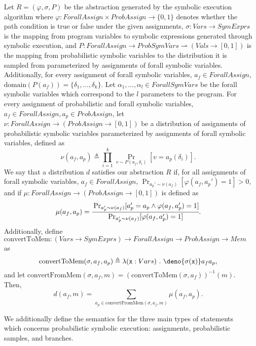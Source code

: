 \documentclass[acmsmall,review]{acmart}\settopmatter{}
\begin{document}
	\begin{definition}
		\label{def:combined}
		Let $R = (\varphi, \sigma, P)$ be the abstraction generated by the symbolic execution algorithm where $\varphi: ForallAssign \times ProbAssign \rightarrow \{0,1\}$ denotes whether the path condition is true or false under the given assignments, $\sigma : Vars \rightarrow SymExprs$ is the mapping from program variables to symbolic expressions generated through symbolic execution, and $P : ForallAssign \rightarrow ProbSymVars \rightharpoonup (Vals \rightarrow [0,1])$  is the mapping from probabilistic symbolic variables to the distribution it is sampled from parameterized by assignments of forall symbolic variables.
		Additionally, for every assignment of forall symbolic variables, $a_f \in ForallAssign$, $\mathrm{domain}(P(a_f)) = \{\delta_1,\ldots,\delta_k\}$.
		Let $\alpha_1,\ldots,\alpha_l \in ForallSymVars$ be the forall symbolic variables which correspond to the $l$ parameters to the program.
		For every assignment of probabilistic and forall symbolic variables, $a_f \in ForallAssign, a_p \in ProbAssign$, let $\nu : ForallAssign \rightarrow (ProbAssign \rightarrow [0,1])$ be a distribution of assignments of probabilistic symbolic variables parameterized by assignments of forall symbolic variables, defined as
		\[
		\nu(a_f,a_p) \triangleq \prod_{i=1}^k \Pr_{v \sim P(a_f,\delta_i)}[v = a_p(\delta_i)].
		\]
		We say that a distribution $d$ satisfies our abstraction $R$ if, for all assignments of forall symbolic variables, $a_f \in ForallAssign$, $\displaystyle\Pr_{a_p' \sim \nu(a_f)}[\varphi(a_f,a_p') = 1] > 0$, and if $\mu : ForallAssign \rightarrow (ProbAssign \rightarrow [0,1])$ is defined as 
		\[
		\mu(a_f,a_p) = \cfrac{\Pr_{a_p' \sim \nu(a_f)}[a_p' = a_p \land \varphi(a_f,a_p') = 1]}{\Pr_{a_p' \sim \nu(a_f)}[\varphi(a_f,a_p')=1]}.
		\]
		Additionally, define $\text{convertToMem} : (Vars \rightarrow SymExprs) \rightarrow ForallAssign \rightarrow ProbAssign \rightarrow Mem$ as
		\begin{equation*}
			\text{convertToMem}(\sigma,a_f,a_p) \triangleq \lambda (\mathtt{x}: Vars)~.~\deno{\sigma(\mathtt{x})}a_fa_p,
		\end{equation*}
		and let $\text{convertFromMem}(\sigma,a_f,m) = (\text{convertToMem}(\sigma,a_f))^{-1}(m)$.
		Then,
		\[
		d(a_f,m) = \sum_{a_p \in \text{convertFromMem}(\sigma,a_f,m)} \mu(a_f,a_p).
		\]
	\end{definition}
	
	We additionally define the semantics for the three main types of statements which concerns probabilistic symbolic execution: assignments, probabilistic samples, and branches.
	
\end{document}
